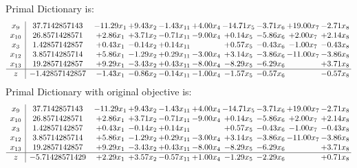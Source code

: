 \documentclass[9pt]{article}
\begin{document}
Primal Dictionary is:
\[\begin{array}{c| c c@{\hskip 2pt} c@{\hskip 2pt} c@{\hskip 2pt} c@{\hskip 2pt} c@{\hskip 2pt} c@{\hskip 2pt} c@{\hskip 2pt} c@{\hskip 2pt} }
 x_{9}   &  37.7142857143 & -11.29 x_{1} & +  9.43 x_{2} & -1.43 x_{11} & +  4.00 x_{4} & -14.71 x_{5} & -3.71 x_{6} & + 19.00 x_{7} & -2.71 x_{8}\\
 x_{10}   &  26.8571428571 & +  2.86 x_{1} & +  3.71 x_{2} & -0.71 x_{11} & -9.00 x_{4} & +  0.14 x_{5} & -5.86 x_{6} & +  2.00 x_{7} & +  2.14 x_{8}\\
 x_{3}   &  1.42857142857 & +  0.43 x_{1} & -0.14 x_{2} & +  0.14 x_{11} &   & +  0.57 x_{5} & -0.43 x_{6} & -1.00 x_{7} & -0.43 x_{8}\\
 x_{12}   &  3.85714285714 & +  5.86 x_{1} & -1.29 x_{2} & +  0.29 x_{11} & -3.00 x_{4} & +  3.14 x_{5} & -3.86 x_{6} & -11.00 x_{7} & -3.86 x_{8}\\
 x_{13}   &  19.2857142857 & +  9.29 x_{1} & -3.43 x_{2} & +  0.43 x_{11} & -8.00 x_{4} & -8.29 x_{5} & -6.29 x_{6} &   & +  3.71 x_{8}\\
\hline
z    &  -1.42857142857 & -1.43 x_{1} & -0.86 x_{2} & -0.14 x_{11} & -1.00 x_{4} & -1.57 x_{5} & -0.57 x_{6} &   & -0.57 x_{8}\\
\end{array}\]
Primal Dictionary with original objective is:
\[\begin{array}{c| c c@{\hskip 2pt} c@{\hskip 2pt} c@{\hskip 2pt} c@{\hskip 2pt} c@{\hskip 2pt} c@{\hskip 2pt} c@{\hskip 2pt} c@{\hskip 2pt} }
 x_{9}   &  37.7142857143 & -11.29 x_{1} & +  9.43 x_{2} & -1.43 x_{11} & +  4.00 x_{4} & -14.71 x_{5} & -3.71 x_{6} & + 19.00 x_{7} & -2.71 x_{8}\\
 x_{10}   &  26.8571428571 & +  2.86 x_{1} & +  3.71 x_{2} & -0.71 x_{11} & -9.00 x_{4} & +  0.14 x_{5} & -5.86 x_{6} & +  2.00 x_{7} & +  2.14 x_{8}\\
 x_{3}   &  1.42857142857 & +  0.43 x_{1} & -0.14 x_{2} & +  0.14 x_{11} &   & +  0.57 x_{5} & -0.43 x_{6} & -1.00 x_{7} & -0.43 x_{8}\\
 x_{12}   &  3.85714285714 & +  5.86 x_{1} & -1.29 x_{2} & +  0.29 x_{11} & -3.00 x_{4} & +  3.14 x_{5} & -3.86 x_{6} & -11.00 x_{7} & -3.86 x_{8}\\
 x_{13}   &  19.2857142857 & +  9.29 x_{1} & -3.43 x_{2} & +  0.43 x_{11} & -8.00 x_{4} & -8.29 x_{5} & -6.29 x_{6} &   & +  3.71 x_{8}\\
\hline
z    &  -5.71428571429 & +  2.29 x_{1} & +  3.57 x_{2} & -0.57 x_{11} & +  1.00 x_{4} & -1.29 x_{5} & -2.29 x_{6} &   & +  0.71 x_{8}\\
\end{array}\]
\end{document}
